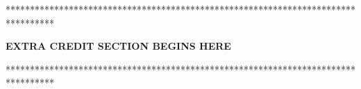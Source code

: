 \documentclass[12pt]{article}
\newcommand\tab[1][1cm]{\hspace*{#1}}
\begin{document}
\pagebreak
**********************************************************************************

\tab\tab\tab \textbf{EXTRA CREDIT SECTION BEGINS HERE}

**********************************************************************************
\end{document}
